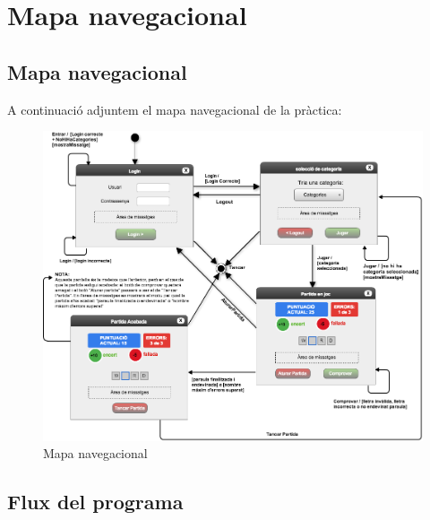 

\section{Mapa navegacional}
\subsection{Mapa navegacional}
A continuació adjuntem el mapa navegacional de la pràctica:

    \begin{figure}[h]
    \centering
    \includegraphics[width=1.0\textwidth]{images/navMap.png}
    \caption{ Mapa navegacional}
    \end{figure}


\subsection{Flux del programa}

